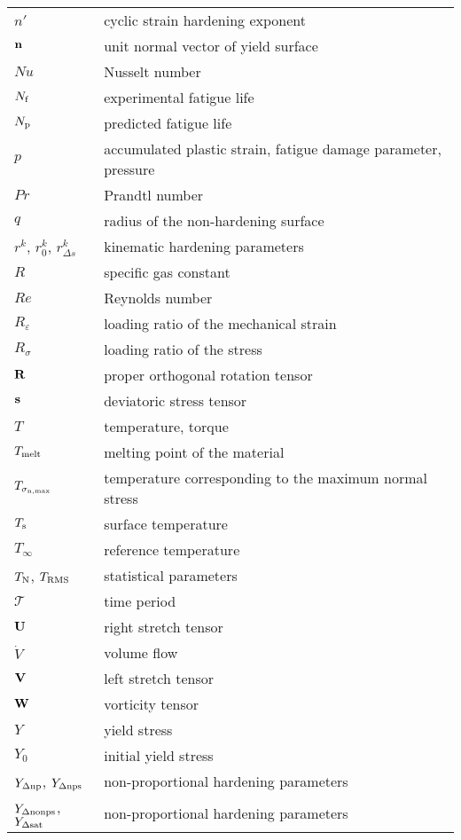 \begin{table}[htb]
  \centering
    \begin{tabular}{p{3cm}p{10.5cm}}
    $n'$ & cyclic strain hardening exponent \\
    $\bf{n}$ & unit normal vector of yield surface \\
    $Nu$ & Nusselt number \\
    $N_{\rm{f}}$ & experimental fatigue life \\
    $N_{\rm{p}}$ & predicted fatigue life \\
    $p$   & accumulated plastic strain, fatigue damage parameter, pressure \\
    $Pr$ & Prandtl number \\
    $q$   & radius of the non-hardening surface \\
    $r^k$, $r_0^k$, $r_{\Delta s}^k$   & kinematic hardening parameters \\
    $R$ & specific gas constant \\
    $Re$ & Reynolds number \\
    $R_{\varepsilon}$ & loading ratio of the mechanical strain \\
    $R_{\sigma}$ & loading ratio of the stress \\
    $\bf{R}$ & proper orthogonal rotation tensor \\
    $\bf{s}$ & deviatoric stress tensor \\
    $T$ & temperature, torque \\
    $T_{\rm melt}$ & melting point of the material \\
    ${T_{{\sigma _{\rm n,\max }}}}$ & temperature corresponding to the maximum normal stress \\
    $T_{\rm s}$ & surface temperature \\
    $T_{\infty}$ & reference temperature \\
    $T_{\rm N}$, $T_{\rm RMS}$ & statistical parameters \\
    $\mathscr{T}$ & time period \\
    $\bf{U}$ & right stretch tensor \\
    ${\dot V}$ & volume flow \\
    $\bf{V}$ & left stretch tensor \\
    $\bf{W}$ & vorticity tensor \\
    $Y$ & yield stress \\
    $Y_0$ & initial yield stress \\
    $Y_{\Delta \rm np}$, $Y_{\Delta \rm nps}$ & non-proportional hardening parameters \\
    $Y_{\Delta \rm nonps}$, $Y_{\Delta \rm sat}$ & non-proportional hardening parameters \\
    \end{tabular}%
  \label{Tab:latin_2}%
\end{table}%

